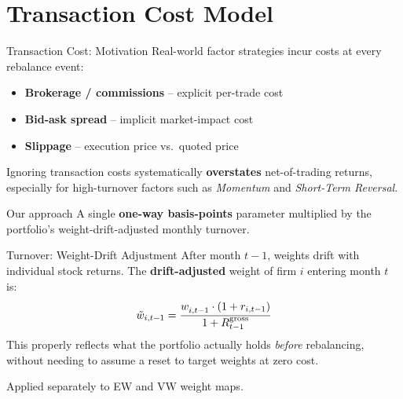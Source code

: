 \documentclass[aspectratio=169, 12pt]{beamer}
\begin{document}
\section{Transaction Cost Model}

\begin{frame}{Transaction Cost: Motivation}
  Real-world factor strategies incur costs at every rebalance event:
  \begin{itemize}
    \item \textbf{Brokerage / commissions} -- explicit per-trade cost
    \item \textbf{Bid-ask spread} -- implicit market-impact cost
    \item \textbf{Slippage} -- execution price vs.\ quoted price
  \end{itemize}

  \medskip
  Ignoring transaction costs systematically \textbf{overstates} net-of-trading returns,
  especially for high-turnover factors such as \textit{Momentum} and \textit{Short-Term Reversal}.

  \medskip
  \begin{alertblock}{Our approach}
    A single \textbf{one-way basis-points} parameter multiplied by the portfolio's
    weight-drift-adjusted monthly turnover.
  \end{alertblock}
\end{frame}

\begin{frame}{Turnover: Weight-Drift Adjustment}
  After month $t-1$, weights drift with individual stock returns.
  The \textbf{drift-adjusted} weight of firm $i$ entering month $t$ is:
  \[
    \tilde{w}_{i,t-1} = \frac{w_{i,t-1}^{\vphantom{EW}} \cdot (1 + r_{i,t-1})}{1 + R_{t-1}^{\text{gross}}}
  \]
  This properly reflects what the portfolio actually holds \emph{before} rebalancing,
  without needing to assume a reset to target weights at zero cost.

  \medskip
  Applied separately to EW and VW weight maps.
\end{frame}
\end{document}
